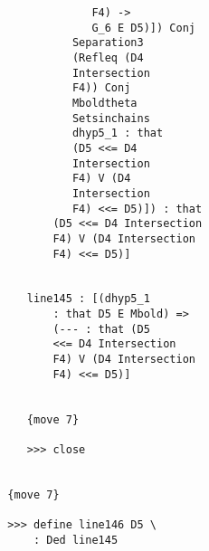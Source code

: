 \documentclass[12pt]{article}
\begin{document}
\begin{verbatim}
                                  F4) -> 
                                  G_6 E D5)]) Conj 
                               Separation3 
                               (Refleq (D4 
                               Intersection 
                               F4)) Conj 
                               Mboldtheta 
                               Setsinchains 
                               dhyp5_1 : that 
                               (D5 <<= D4 
                               Intersection 
                               F4) V (D4 
                               Intersection 
                               F4) <<= D5)]) : that 
                            (D5 <<= D4 Intersection 
                            F4) V (D4 Intersection 
                            F4) <<= D5)]


                        line145 : [(dhyp5_1 
                            : that D5 E Mbold) => 
                            (--- : that (D5 
                            <<= D4 Intersection 
                            F4) V (D4 Intersection 
                            F4) <<= D5)]


                        {move 7}

                        >>> close


                     {move 7}

                     >>> define line146 D5 \
                         : Ded line145



\end{verbatim}
\end{document}
